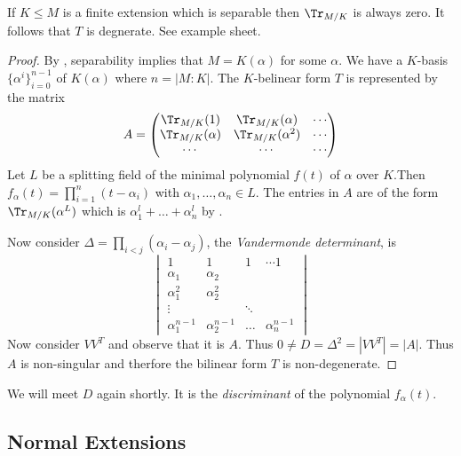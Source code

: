 \documentclass[a4paper]{article}
\begin{document}
\begin{remark}
  If \(K \leq M\) is a finite extension which is separable then \(\Tr_{M/K}\) is always zero. It follows that \(T\) is degnerate. See example sheet.
\end{remark}

\begin{proof}
  By , separability implies that \(M = K(\alpha)\) for some \(\alpha\). We have a \(K\)-basis \(\{\alpha^i\}_{i = 0}^{n - 1}\) of \(K(\alpha)\) where \(n = |M:K|\). The \(K\)-belinear form \(T\) is represented by the matrix
  \[
    A =
    \begin{pmatrix}
      \Tr_{M/K}(1) & \Tr_{M/K}(\alpha) & \cdots \\
      \Tr_{M/K}(\alpha) & \Tr_{M/K}(\alpha^2) & \cdots \\
      \cdots & \cdots & \cdots
    \end{pmatrix}
  \]
  Let \(L\) be a splitting field of the minimal polynomial \(f(t)\) of \(\alpha\) over \(K\).Then \(f_\alpha(t) = \prod_{i = 1}^n (t - \alpha_i)\) with \(\alpha_1, \dots, \alpha_n \in L\). The entries in \(A\) are of the form \(\Tr_{M/K}(\alpha^L)\) which is \(\alpha_1^l + \dots + \alpha_n^l\) by .

  Now consider \(\Delta = \prod_{i < j} (\alpha_i - \alpha_j)\), the \emph{Vandermonde determinant}, is
  \[
    \begin{vmatrix}
      1 & 1 & 1 & \cdots 1 \\
      \alpha_1 & \alpha_2 & & \\
      \alpha_1^2 & \alpha_2^2 & & \\
      \vdots & & \ddots & \\
      \alpha_1^{n - 1} & \alpha_2^{n - 1} & \dots & \alpha_n^{n - 1}
    \end{vmatrix}
  \]
  Now consider \(VV^T\) and observe that it is \(A\). Thus \(0 \neq D = \Delta^2 = |VV^T| = |A|\). Thus \(A\) is non-singular and therfore the bilinear form \(T\) is non-degenerate.
\end{proof}

\begin{remark}
  We will meet \(D\) again shortly. It is the \emph{discriminant} of the polynomial \(f_\alpha(t)\).
\end{remark}

\subsection{Normal Extensions}
\end{document}
